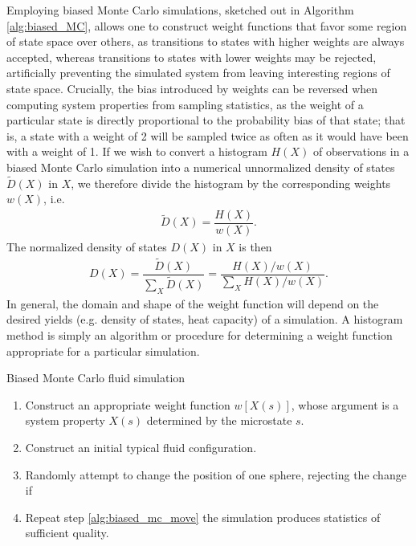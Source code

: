 \documentclass[11pt]{article}
\newcommand{\f}[2]{\dfrac{#1}{#2}} %
\newcommand{\p}[1]{\left(#1\right)} %
\renewcommand{\sp}[1]{\left[#1\right]} %
\newenvironment{alg}
{\hrulefill\begin{enumerate}}
{\end{enumerate}\hrulefill}
\begin{document}
Employing biased Monte Carlo simulations, sketched out in Algorithm
\ref{alg:biased_MC}, allows one to construct weight functions that
favor some region of state space over others, as transitions to states
with higher weights are always accepted, whereas transitions to states
with lower weights may be rejected, artificially preventing the
simulated system from leaving interesting regions of state
space. Crucially, the bias introduced by weights can be reversed when
computing system properties from sampling statistics, as the weight of
a particular state is directly proportional to the probability bias of
that state; that is, a state with a weight of 2 will be sampled twice
as often as it would have been with a weight of 1. If we wish to
convert a histogram $H\p{X}$ of observations in a biased Monte Carlo
simulation into a numerical unnormalized density of states $\tilde
D\p{X}$ in $X$, we therefore divide the histogram by the corresponding
weights $w\p{X}$, i.e.
\begin{align}
  \tilde D\p{X}=\f{H\p{X}}{w\p{X}}.
  \label{eq:dos}
\end{align}
The normalized density of states $D\p{X}$ in $X$ is then
\begin{align}
  D\p{X}=\f{\tilde D\p{X}}{\sum_X\tilde D\p{X}}
  =\f{H\p{X}/w\p{X}}{\sum_XH\p{X}/w\p{X}}.
  \label{eq:dos_norm}
\end{align}
In general, the domain and shape of the weight function will depend on
the desired yields (e.g.  density of states, heat capacity) of a
simulation. A histogram method is simply an algorithm or procedure for
determining a weight function appropriate for a particular simulation.

\begin{algorithm}[tb]
  \caption{Biased Monte Carlo fluid simulation}
  \label{alg:biased_MC}
  \begin{alg}

  \item Construct an appropriate weight function $w\sp{X\p{s}}$, whose
    argument is a system property $X\p{s}$ determined by the
    microstate $s$.

  \item Construct an initial typical fluid configuration.

  \item Randomly attempt to change the position of one sphere,
    rejecting the change if
    \label{alg:biased_mc_move}

  \item Repeat step \ref{alg:biased_mc_move} the simulation produces
    statistics of sufficient quality.

  \end{alg}
\end{algorithm}
\end{document}

